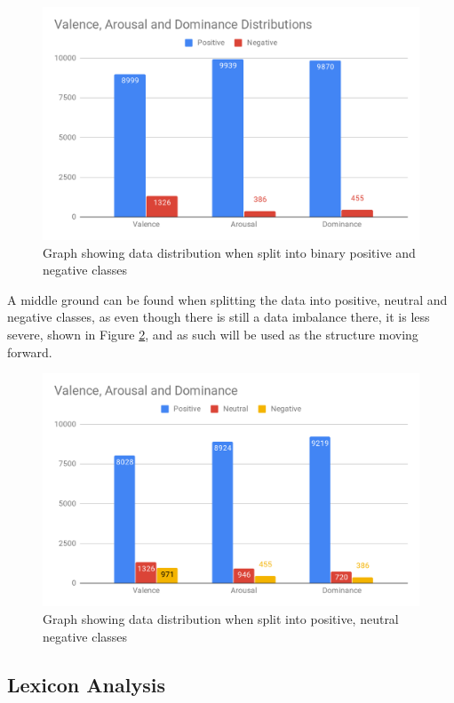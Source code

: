 \begin{figure}[ht]
\centering
\includegraphics[scale=0.3]{graphs/binaryDist.png}
\caption{Graph showing data distribution when split into binary positive and negative classes}
\label{dist:bin}
\end{figure}
\pagebreak
A middle ground can be found when splitting the data into positive, neutral and negative classes, as even though there is still a data imbalance there, it is less severe, shown in Figure \ref{dist:tri}, and as such will be used as the structure moving forward.

\begin{figure}[H]
\centering
\includegraphics[scale=0.35]{graphs/nonBinaryDist.png}
\caption{Graph showing data distribution when split into positive, neutral negative classes}
\label{dist:tri}
\end{figure}

\subsection{Lexicon Analysis}

